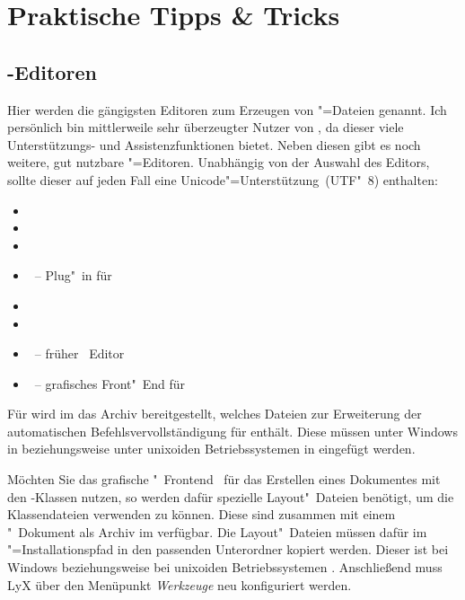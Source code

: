 \chapter{Praktische Tipps \& Tricks}
\newcommand*\TaT{\hyperref[sec:tips]{Tipps \& Tricks}:\xspace}
\section{-Editoren}
%
%
Hier werden die gängigsten Editoren zum Erzeugen von "=Dateien 
genannt. Ich persönlich bin mittlerweile sehr überzeugter Nutzer von 
, da dieser viele Unterstützungs- und 
Assistenzfunktionen bietet. Neben diesen gibt es noch weitere, gut nutzbare 
"=Editoren. Unabhängig von der Auswahl des Editors, sollte dieser 
auf jeden Fall eine Unicode"=Unterstützung~(UTF"~8) enthalten:
%
\begin{itemize}
\item {}
\item {}
\item {}
\item {}~-- Plug"~in für 
\item {}
\item {}
\item {}~-- früher ~Editor
\item {}~-- grafisches Front"~End für 
\end{itemize}
%
Für  wird im \GitHubRepo* das Archiv 
bereitgestellt, welches Dateien zur Erweiterung der automatischen 
Befehlsvervollständigung für \TUDScript enthält. Diese müssen unter Windows in 
 beziehungsweise unter unixoiden 
Betriebssystemen in  eingefügt werden.

Möchten Sie das grafische "~Frontend~ 
für das Erstellen eines Dokumentes mit den \TUDScript-Klassen nutzen, so werden 
dafür spezielle Layout"~Dateien benötigt, um die Klassendateien verwenden zu 
können. Diese sind zusammen mit einem "~Dokument als 
Archiv 
im \GitHubRepo* verfügbar. Die Layout"~Dateien müssen dafür im 
"=Installationspfad in den passenden Unterordner 
kopiert werden. Dieser ist bei Windows
beziehungsweise bei unixoiden Betriebssystemen .
Anschließend muss LyX über den Menüpunkt \emph{Werkzeuge} neu konfiguriert 
werden. 




